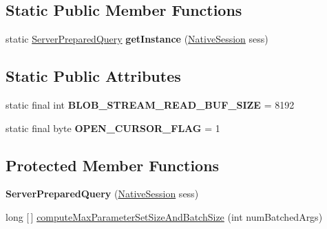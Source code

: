 \subsection*{Static Public Member Functions}
\begin{DoxyCompactItemize}
\item 
\mbox{\label{classcom_1_1mysql_1_1cj_1_1_server_prepared_query_ac255ccf3f9e59cd9b6fcbdbaed9dc5f9}} 
static \mbox{\hyperlink{classcom_1_1mysql_1_1cj_1_1_server_prepared_query}{Server\+Prepared\+Query}} {\bfseries get\+Instance} (\mbox{\hyperlink{classcom_1_1mysql_1_1cj_1_1_native_session}{Native\+Session}} sess)
\end{DoxyCompactItemize}
\subsection*{Static Public Attributes}
\begin{DoxyCompactItemize}
\item 
\mbox{\label{classcom_1_1mysql_1_1cj_1_1_server_prepared_query_a31968a0571fd7a5b77a7353ab2458eeb}} 
static final int {\bfseries B\+L\+O\+B\+\_\+\+S\+T\+R\+E\+A\+M\+\_\+\+R\+E\+A\+D\+\_\+\+B\+U\+F\+\_\+\+S\+I\+ZE} = 8192
\item 
\mbox{\label{classcom_1_1mysql_1_1cj_1_1_server_prepared_query_a6578a6a2b278767240b8d382dc355928}} 
static final byte {\bfseries O\+P\+E\+N\+\_\+\+C\+U\+R\+S\+O\+R\+\_\+\+F\+L\+AG} = 1
\end{DoxyCompactItemize}
\subsection*{Protected Member Functions}
\begin{DoxyCompactItemize}
\item 
\mbox{\label{classcom_1_1mysql_1_1cj_1_1_server_prepared_query_a69d79ba4465bd1b0c57ba05a75009f9b}} 
{\bfseries Server\+Prepared\+Query} (\mbox{\hyperlink{classcom_1_1mysql_1_1cj_1_1_native_session}{Native\+Session}} sess)
\item 
long \mbox{[}$\,$\mbox{]} \mbox{\hyperlink{classcom_1_1mysql_1_1cj_1_1_server_prepared_query_a2b7f3b7ca471b130821b1a3f85f9743e}{compute\+Max\+Parameter\+Set\+Size\+And\+Batch\+Size}} (int num\+Batched\+Args)
\end{DoxyCompactItemize}
